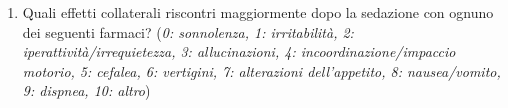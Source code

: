 \begin{tcolorbox}
\begin{enumerate}
           \item Quali effetti collaterali riscontri maggiormente dopo la sedazione con ognuno dei seguenti farmaci? (\emph{0: sonnolenza, 1: irritabilità, 2: iperattività/irrequietezza, 3: allucinazioni, 4: incoordinazione/impaccio motorio, 5: cefalea, 6: vertigini, 7: alterazioni dell’appetito, 8: nausea/vomito, 9: dispnea, 10: altro})
           
\begin{comment}
    \bgroup
        \def\arraystretch{1.5}
        \begin{table}[!ht]
            \begin{tabular}{ll}
                $\qquad\enspace\,\,\,\,\,\bullet$ propofol (\texttt{EV}): & 0 1 2 3 4 5 6 7 8 9 10\\
                ketamina (\texttt{EV}, \texttt{IM}): & 0 1 2 3 4 5 6 7 8 9 10\\
                dexmedetomidina (\texttt{EV}, \texttt{IM}): & 0 1 2 3 4 5 6 7 8 9 10\\
                midazolam (\texttt{EV}, \texttt{IN}, \texttt{OS}): & 0 1 2 3 4 5 6 7 8 9 10
            \end{tabular}
        \end{table}
    \egroup   
\end{comment}


\end{enumerate}
\end{tcolorbox}
